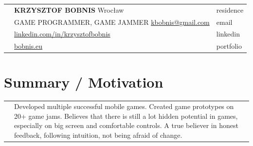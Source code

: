 \documentclass[12pt,a4paper]{article}
\begin{document}
\begin{tabular}  { >{\RaggedLeft}p{0cm} p{15.5cm}  p{2cm} }  
	& {\Large \textbf{KRZYSZTOF BOBNIS}} \hfill Wrocław & \textcolor{techColor}{residence} \\
	& GAME PROGRAMMER, GAME JAMMER \hfill  {\href{mailto:kbobnis@gmail.com}{kbobnis@gmail.com}} & \textcolor{techColor}{email} \\ 
	& \hfill {\href{https://www.linkedin.com/in/krzysztofbobnis}{linkedin.com/in/krzysztofbobnis}} & \textcolor{techColor}{linkedin} \\
	& \hfill {\href{http://bobnis.eu}{bobnis.eu}} & \textcolor{techColor}{portfolio} \\
\end{tabular}	 

\vspace{0.0cm}

\centering
\section*{Summary / Motivation}

	\begin{tabular}  { >{\RaggedLeft}p{0cm}  p{17cm}  p{0cm} }  

		 & Developed multiple successful mobile games. Created game prototypes on 20+ game jams. Believes that there is still a lot hidden potential in games, especially on big screen and comfortable controls. A true believer in honest feedback, following intuition, not being afraid of change. & \\
	\end{tabular}

\vspace*{1cm}
\end{document}
